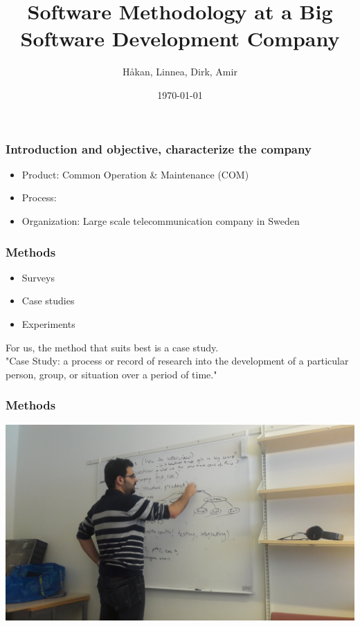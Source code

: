 \documentclass{beamer}
\begin{document}



\title{Software Methodology at a Big Software Development Company}
\author{H\aa kan, Linnea, Dirk, Amir}

\date{\today}

\begin{frame}
\titlepage
\end{frame}

\begin{frame}\frametitle{Introduction and objective, characterize the company}
\begin{itemize}
\item Product: Common Operation \& Maintenance (COM)
\item Process:
\item Organization: Large scale telecommunication company in Sweden
\end{itemize}
\end{frame}

\begin{frame}
  \frametitle{Methods}
  \begin{itemize}
  \item Surveys
   \item Case studies
   \item Experiments
  \end{itemize}
  For us, the method that suits best is a case study. \\
  "Case Study: a process or record of research into the development of a particular person, group, or situation over a period of time."
\end{frame}

\begin{frame}
  \frametitle{Methods}
  \begin{center}
    \includegraphics[width=1\textwidth]{figs/amir.jpg}
  \end{center}
\end{frame}
\end{document}
